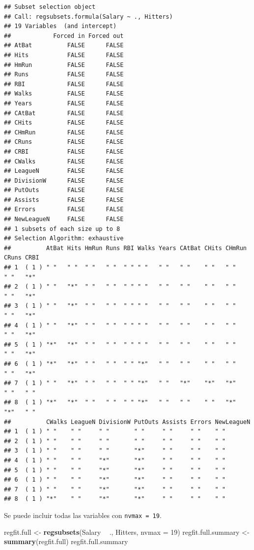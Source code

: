 \documentclass[
  12pt,
]{book}
\newenvironment{Shaded}{\begin{snugshade}}{\end{snugshade}}
\newcommand{\DataTypeTok}[1]{\textcolor[rgb]{0.13,0.29,0.53}{#1}}
\newcommand{\DecValTok}[1]{\textcolor[rgb]{0.00,0.00,0.81}{#1}}
\newcommand{\KeywordTok}[1]{\textcolor[rgb]{0.13,0.29,0.53}{\textbf{#1}}}
\newcommand{\NormalTok}[1]{#1}
\newcommand{\OperatorTok}[1]{\textcolor[rgb]{0.81,0.36,0.00}{\textbf{#1}}}
\newcommand{\StringTok}[1]{\textcolor[rgb]{0.31,0.60,0.02}{#1}}
\theoremstyle{definition}
\theoremstyle{definition}
\theoremstyle{definition}
\theoremstyle{remark}
\begin{document}
\begin{verbatim}
## Subset selection object
## Call: regsubsets.formula(Salary ~ ., Hitters)
## 19 Variables  (and intercept)
##            Forced in Forced out
## AtBat          FALSE      FALSE
## Hits           FALSE      FALSE
## HmRun          FALSE      FALSE
## Runs           FALSE      FALSE
## RBI            FALSE      FALSE
## Walks          FALSE      FALSE
## Years          FALSE      FALSE
## CAtBat         FALSE      FALSE
## CHits          FALSE      FALSE
## CHmRun         FALSE      FALSE
## CRuns          FALSE      FALSE
## CRBI           FALSE      FALSE
## CWalks         FALSE      FALSE
## LeagueN        FALSE      FALSE
## DivisionW      FALSE      FALSE
## PutOuts        FALSE      FALSE
## Assists        FALSE      FALSE
## Errors         FALSE      FALSE
## NewLeagueN     FALSE      FALSE
## 1 subsets of each size up to 8
## Selection Algorithm: exhaustive
##          AtBat Hits HmRun Runs RBI Walks Years CAtBat CHits CHmRun CRuns CRBI
## 1  ( 1 ) " "   " "  " "   " "  " " " "   " "   " "    " "   " "    " "   "*" 
## 2  ( 1 ) " "   "*"  " "   " "  " " " "   " "   " "    " "   " "    " "   "*" 
## 3  ( 1 ) " "   "*"  " "   " "  " " " "   " "   " "    " "   " "    " "   "*" 
## 4  ( 1 ) " "   "*"  " "   " "  " " " "   " "   " "    " "   " "    " "   "*" 
## 5  ( 1 ) "*"   "*"  " "   " "  " " " "   " "   " "    " "   " "    " "   "*" 
## 6  ( 1 ) "*"   "*"  " "   " "  " " "*"   " "   " "    " "   " "    " "   "*" 
## 7  ( 1 ) " "   "*"  " "   " "  " " "*"   " "   "*"    "*"   "*"    " "   " " 
## 8  ( 1 ) "*"   "*"  " "   " "  " " "*"   " "   " "    " "   "*"    "*"   " " 
##          CWalks LeagueN DivisionW PutOuts Assists Errors NewLeagueN
## 1  ( 1 ) " "    " "     " "       " "     " "     " "    " "       
## 2  ( 1 ) " "    " "     " "       " "     " "     " "    " "       
## 3  ( 1 ) " "    " "     " "       "*"     " "     " "    " "       
## 4  ( 1 ) " "    " "     "*"       "*"     " "     " "    " "       
## 5  ( 1 ) " "    " "     "*"       "*"     " "     " "    " "       
## 6  ( 1 ) " "    " "     "*"       "*"     " "     " "    " "       
## 7  ( 1 ) " "    " "     "*"       "*"     " "     " "    " "       
## 8  ( 1 ) "*"    " "     "*"       "*"     " "     " "    " "
\end{verbatim}

Se puede incluir todas las variables con \texttt{nvmax\ =\ 19}.

\begin{Shaded}
\begin{Highlighting}[]
\NormalTok{regfit.full <-}\StringTok{ }\KeywordTok{regsubsets}\NormalTok{(Salary }\OperatorTok{~}\StringTok{ }\NormalTok{., Hitters, }\DataTypeTok{nvmax =} \DecValTok{19}\NormalTok{)}
\NormalTok{regfit.full.summary <-}\StringTok{ }\KeywordTok{summary}\NormalTok{(regfit.full)}
\NormalTok{regfit.full.summary}
\end{Highlighting}
\end{Shaded}
\end{document}
